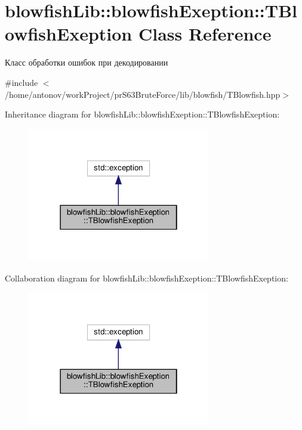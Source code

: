 \hypertarget{classblowfish_lib_1_1blowfish_exeption_1_1_t_blowfish_exeption}{}\section{blowfish\+Lib\+:\+:blowfish\+Exeption\+:\+:T\+Blowfish\+Exeption Class Reference}
\label{classblowfish_lib_1_1blowfish_exeption_1_1_t_blowfish_exeption}


Класс обработки ошибок при декодировании  




{\ttfamily \#include $<$/home/antonov/work\+Project/pr\+S63\+Brute\+Force/lib/blowfish/\+T\+Blowfish.\+hpp$>$}



Inheritance diagram for blowfish\+Lib\+:\+:blowfish\+Exeption\+:\+:T\+Blowfish\+Exeption\+:\nopagebreak
\begin{figure}[H]
\begin{center}
\leavevmode
\includegraphics[width=226pt]{classblowfish_lib_1_1blowfish_exeption_1_1_t_blowfish_exeption__inherit__graph}
\end{center}
\end{figure}


Collaboration diagram for blowfish\+Lib\+:\+:blowfish\+Exeption\+:\+:T\+Blowfish\+Exeption\+:\nopagebreak
\begin{figure}[H]
\begin{center}
\leavevmode
\includegraphics[width=226pt]{classblowfish_lib_1_1blowfish_exeption_1_1_t_blowfish_exeption__coll__graph}
\end{center}
\end{figure}
